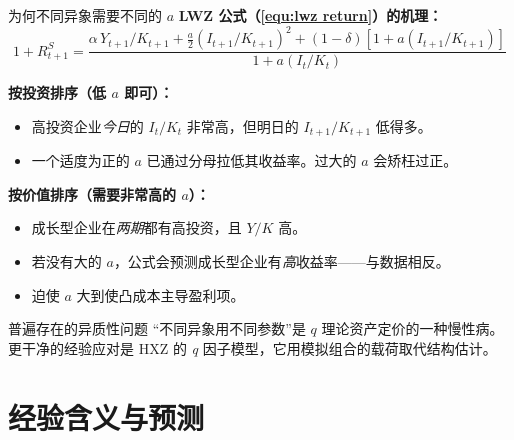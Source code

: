 \documentclass{beamer}
\begin{document}
\begin{frame}{为何不同异象需要不同的 $a$}
    \textbf{LWZ 公式（\ref{equ:lwz return}）的机理：}
    \begin{equation*}
        1 + R^S_{t+1} = \frac{\alpha\, Y_{t+1}/K_{t+1} + \frac{a}{2}(I_{t+1}/K_{t+1})^2 + (1-\delta)[1+a(I_{t+1}/K_{t+1})]}{1 + a(I_t/K_t)}
    \end{equation*}

    \vspace{0.1cm}
    \textbf{按投资排序（低 $a$ 即可）：}
    \begin{itemize}
        \item 高投资企业\textit{今日}的 $I_t/K_t$ 非常高，但明日的 $I_{t+1}/K_{t+1}$ 低得多。
        \item 一个适度为正的 $a$ 已通过分母拉低其收益率。过大的 $a$ 会矫枉过正。
    \end{itemize}

    \vspace{0.15cm}
    \textbf{按价值排序（需要非常高的 $a$）：}
    \begin{itemize}
        \item 成长型企业在\textit{两期}都有高投资，且 $Y/K$ 高。
        \item 若没有大的 $a$，公式会预测成长型企业有\textit{高}收益率——与数据相反。
        \item 迫使 $a$ 大到使凸成本主导盈利项。
    \end{itemize}

    \vspace{0.15cm}
    \begin{block}{普遍存在的异质性问题}
        “不同异象用不同参数”是 $q$ 理论资产定价的一种慢性病。更干净的经验应对是 HXZ 的 \textit{q} 因子模型，它用模拟组合的载荷取代结构估计。
    \end{block}
\end{frame}

\section{经验含义与预测}
\end{document}
